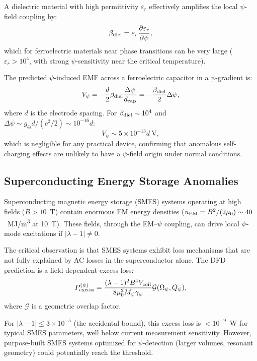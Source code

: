 \documentclass[aps,prd,twocolumn,showpacs,preprintnumbers,superscriptaddress,nofootinbib]{revtex4-2}
\begin{document}
A dielectric material with high permittivity $\varepsilon_r$ effectively
amplifies the local $\psi$-field coupling by:
\begin{equation}
\beta_{\rm diel} = \varepsilon_r\frac{\partial\varepsilon_r}{\partial\psi},
\end{equation}
which for ferroelectric materials near phase transitions can be very large
($\varepsilon_r > 10^4$, with strong $\psi$-sensitivity near the critical
temperature).

The predicted $\psi$-induced EMF across a ferroelectric capacitor in a
$\psi$-gradient is:
\begin{equation}
V_\psi = -\frac{d}{2}\beta_{\rm diel}\frac{\Delta\psi}{d_{\rm cap}} = -\frac{\beta_{\rm diel}}{2}\Delta\psi,
\end{equation}
where $d$ is the electrode spacing.  For $\beta_{\rm diel}\sim 10^4$ and
$\Delta\psi \sim g_\oplus d/(c^2/2) \sim 10^{-16}d$:
\begin{equation}
V_\psi \sim 5\times 10^{-13}d~\text{V},
\end{equation}
which is negligible for any practical device, confirming that anomalous
self-charging effects are unlikely to have a $\psi$-field origin under
normal conditions.

\subsection{Superconducting Energy Storage Anomalies}\label{sec:smes-anomalies}

Superconducting magnetic energy storage (SMES) systems operating at high
fields ($B > 10$~T) contain enormous EM energy densities
($u_{\rm EM} = B^2/(2\mu_0) \sim 40$~\si{MJ/m^3} at 10~T).  These
fields, through the EM--$\psi$ coupling, can drive local $\psi$-mode
excitations if $|\lambda-1| \neq 0$.

The critical observation is that SMES systems exhibit loss mechanisms
that are not fully explained by AC losses in the superconductor alone.
The DFD prediction is a field-dependent excess loss:
\begin{equation}
P_{\rm excess}^{(\psi)} = \frac{(\lambda-1)^2 B^4 V_{\rm coil}}{8\mu_0^2 M_\psi\gamma_\psi}\mathcal{G}(\Omega_\psi, Q_\psi),
\end{equation}
where $\mathcal{G}$ is a geometric overlap factor.

For $|\lambda-1| \leq 3\times 10^{-5}$ (the accidental bound), this
excess loss is $< 10^{-9}$~W for typical SMES parameters, well below
current measurement sensitivity.  However, purpose-built SMES systems
optimized for $\psi$-detection (larger volumes, resonant geometry)
could potentially reach the threshold.
\end{document}
